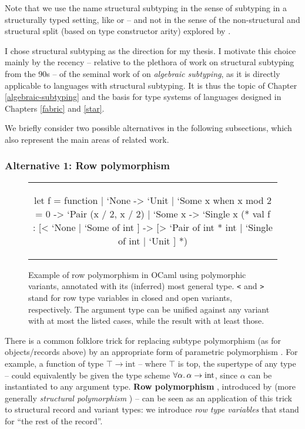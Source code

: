 Note that we use the name structural subtyping in the sense of subtyping in a structurally typed setting, like \textcite{dolan-thesis} or \textcite{cardelli-power-type} -- and not in the sense of the non-structural and structural split (based on type constructor arity) explored by \eg{} \textcite{subtyping-decidability}.

I chose structural subtyping as the direction for my thesis. I motivate this choice mainly by the recency -- relative to the plethora of work on structural subtyping from the 90s -- of the seminal work of \textcite{mlsub} on \emph{algebraic subtyping}, as it is directly applicable to languages with structural subtyping. It is thus the topic of Chapter \ref{algebraic-subtyping} and the basis for type systems of languages designed in Chapters \ref{fabric} and \ref{star}.

We briefly consider two possible alternatives in the following subsections, which also represent the main areas of related work.

\subsubsection{Alternative 1: Row polymorphism}

\begin{figure}
    \centering
    \begin{tabular}{c}
    \begin{ocaml}
let f = function 
    | `None -> `Unit 
    | `Some x when x mod 2 = 0 -> `Pair (x / 2, x / 2) 
    | `Some x -> `Single x
(* 
val f : [< `None | `Some of int ] 
     -> [> `Pair of int * int | `Single of int | `Unit ]
*)
    \end{ocaml}
    \end{tabular}
    \caption{Example of row polymorphism in OCaml using polymorphic variants, annotated with its (inferred) most general type. \texttt{<} and \texttt{>} stand for row type variables in closed and open variants, respectively. The argument type can be unified against any variant with at most the listed cases, while the result with at least those.}
    \label{fig:ocaml-row-polymorphism}
\end{figure}

There is a common folklore trick for replacing subtype polymorphism (as for objects/records above) by an appropriate form of parametric polymorphism \cite{structural-subtyping-as-parameric-polymorphism}. For example, a function of type $\top \to \mathrm{int}$ -- where $\top$ is top, the supertype of any type -- could equivalently be given the type scheme $\forall \alpha \ldotp \alpha \to \mathrm{int}$, since $\alpha$ can be instantiated to any argument type.
\textbf{Row polymorphism} \cite{remy-records}, introduced by \textcite{wand-rows} (more generally \emph{structural polymorphism} \cite{simple-structural-polymorphism}) -- can be seen as an application of this trick to structural record and variant types: we introduce \emph{row type variables} that stand for \enquote{the rest of the record}.

